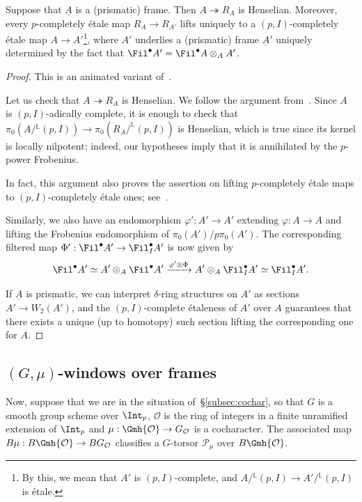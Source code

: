 \documentclass[10pt]{amsart}
\begin{document}
\begin{proposition}
\label{prop:frame_props_hensel}
Suppose that $\underline{A}$ is a (prismatic) frame. Then $A\twoheadrightarrow {R_A}$ is Henselian. Moreover, every $p$-completely \'etale map ${R_A}\to {R_{A'}}$ lifts uniquely to a $(p,I)$-completely \'etale map $A\to A'$\footnote{By this, we mean that $A'$ is $(p,I)$-complete, and $A/{}^{\mathbb{L}}(p,I)\to A'/{}^{\mathbb{L}}(p,I)$ is \'etale.}, where $A'$ underlies a (prismatic) frame $\underline{A}'$ uniquely determined by the fact that $\Fil^\bullet A' = \Fil^\bullet A\otimes_AA'$.
\end{proposition} 
\begin{proof}
This is an animated variant of~\cite[Lemma 4.2.3]{MR4355476}.

Let us check that $A\twoheadrightarrow {R_A}$ is Henselian. We follow the argument from~\cite[Lemma 4.1.28]{MR4530092}. Since $A$ is $(p,I)$-adically complete, it is enough to check that $\pi_0(A/{}^{\mathbb{L}}(p,I))\to \pi_0({R_A}/^{\mathbb{L}}(p,I))$ is Henselian, which is true since its kernel is locally nilpotent; indeed, our hypotheses imply that it is annihilated by the $p$-power Frobenius.

In fact, this argument also proves the assertion on lifting $p$-completely \'etale maps to $(p,I)$-completely \'etale ones; see~\cite[\href{https://stacks.math.columbia.edu/tag/0ALI}{Tag 0ALI}]{stacks-project}. 

Similarly, we also have an endomorphism $\varphi':A'\to A'$ extending $\varphi:A\to A$ and lifting the Frobenius endomorphism of $\pi_0(A')/p\pi_0(A')$. The corresponding filtered map $\Phi':\Fil^\bullet A' \to \Fil^\bullet_I A'$ is now given by
\[
\Fil^\bullet A' \simeq A'\otimes_A\Fil^\bullet A' \xrightarrow{\varphi'\otimes \Phi}A'\otimes_A\Fil^\bullet_I A' \simeq \Fil^\bullet_I A'.
\]

If $\underline{A}$ is prismatic, we can interpret $\delta$-ring structures on $A'$ as sections $A'\to W_2(A')$, and the $(p,I)$-complete \'etaleness of $A'$ over $A$ guarantees that there exists a unique (up to homotopy) such section lifting the corresponding one for $A$.
\end{proof}


\subsection{$(G,\mu)$-windows over frames}
\label{subsec:G_mu_windows}
Now, suppose that we are in the situation of~\S\ref{subsec:cochar}, so that $G$ is a smooth group scheme over $\Int_p$, $\mathcal{O}$ is the ring of integers in a finite unramified extension of $\Int_p$ and $\mu:\Gmh{\mathcal{O}}\to G_{\mathcal{O}}$ is a cocharacter. The associated map $B\mu:B\Gmh{\mathcal{O}}\to BG_{\mathcal{O}}$ classifies a $G$-torsor $\mathcal{P}_\mu$ over $B\Gmh{\mathcal{O}}$.
\end{document}
